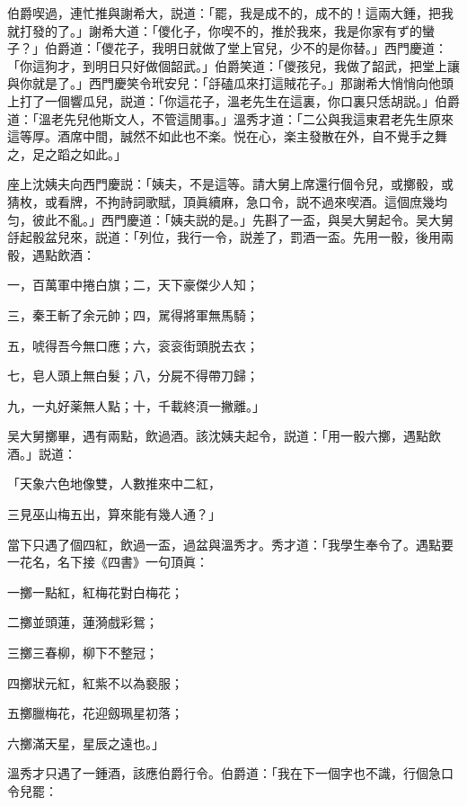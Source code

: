 伯爵喫過，連忙推與謝希大，説道：「罷，我是成不的，成不的！這兩大鍾，把我就打發的了。」謝希大道：「儍化子，你喫不的，推於我來，我是你家有ず的蠻子？」伯爵道：「儍花子，我明日就做了堂上官兒，少不的是你替。」西門慶道：「你這狗才，到明日只好做個韶武。」伯爵笑道：「儍孩兒，我做了韶武，把堂上讓與你就是了。」西門慶笑令玳安兒：「㧱磕瓜來打這賊花子。」那謝希大悄悄向他頭上打了一個響瓜兒，説道：「你這花子，溫老先生在這裏，你口裏只恁胡説。」伯爵道：「溫老先兒他斯文人，不管這閒事。」溫秀才道：「二公與我這東君老先生原來這等厚。酒席中間，誠然不如此也不楽。悦在心，楽主發散在外，自不覺手之舞之，足之蹈之如此。」

座上沈姨夫向西門慶説：「姨夫，不是這等。請大舅上席還行個令兒，或擲骰，或猜枚，或看牌，不拘詩詞歌賦，頂眞續麻，急口令，説不過來喫酒。這個庶幾均匀，彼此不亂。」西門慶道：「姨夫説的是。」先斟了一盃，與吴大舅起令。吴大舅㧱起骰盆兒來，説道：「列位，我行一令，説差了，罰酒一盃。先用一骰，後用兩骰，遇點飲酒：

\begin{myquote}
一，百萬軍中捲白旗；二，天下豪傑少人知；

三，秦王斬了余元帥；四，駡得將軍無馬騎；

五，唬得吾今無口應；六，衮衮街頭脱去衣；

七，皂人頭上無白髮；八，分屍不得帶刀歸；

九，一丸好薬無人點；十，千載終湏一撇離。」
\end{myquote}

吴大舅擲畢，遇有兩點，飲過酒。該沈姨夫起令，説道：「用一骰六擲，遇點飲酒。」説道：

\begin{myquote}
「天象六色地像雙，人數推來中二紅，

三見巫山梅五出，算來能有幾人通？」
\end{myquote}

當下只遇了個四紅，飲過一盃，過盆與溫秀才。秀才道：「我學生奉令了。遇點要一花名，名下接《四書》一句頂眞：

\begin{myquote}
一擲一點紅，紅梅花對白梅花；

二擲並頭蓮，蓮漪戲彩鴛；

三擲三春柳，柳下不整冠；

四擲狀元紅，紅紫不以為褻服；

五擲臘梅花，花迎劔珮星初落；

六擲滿天星，星辰之遠也。」
\end{myquote}

溫秀才只遇了一鍾酒，該應伯爵行令。伯爵道：「我在下一個字也不識，行個急口令兒罷：

